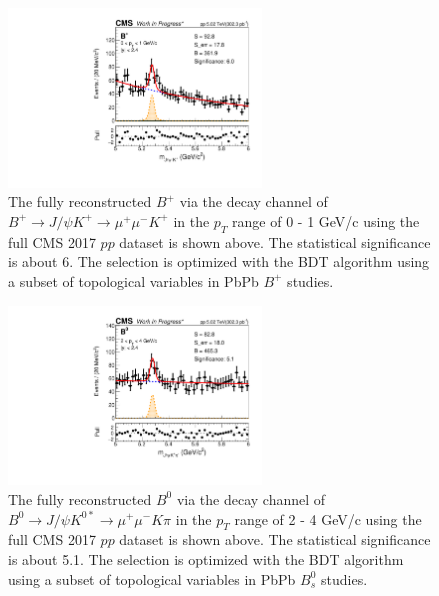 \begin{figure}[hbtp]
\begin{center}
\includegraphics[width=0.60\textwidth]{Figures/Chapter6/BPLow.pdf}
\caption{The fully reconstructed $B^+$ via the decay channel of $B^+\rightarrow J/\psi K^+ \rightarrow \mu^+\mu^- K^+$ in the $p_T$ range of 0 - 1 GeV/c using the full CMS 2017 $pp$ dataset is shown above. The statistical significance is about 6. The selection is optimized with the BDT algorithm using a subset of topological variables in PbPb $B^+$ studies.}
\label{BPLow}
\end{center}
\end{figure}   
 
 \begin{figure}[hbtp]
\begin{center}
\includegraphics[width=0.60\textwidth]{Figures/Chapter6/BZLow.pdf}
\caption{The fully reconstructed $B^0$ via the decay channel of $B^0\rightarrow J/\psi K^{0*} \rightarrow \mu^+\mu^- K \pi$ in the $p_T$ range of 2 - 4 GeV/c using the full CMS 2017 $pp$ dataset is shown above. The statistical significance is about 5.1. The selection is optimized with the BDT algorithm using a subset of topological variables in PbPb $B^0_s$ studies.}
\label{BZLow}
\end{center}
\end{figure}   


